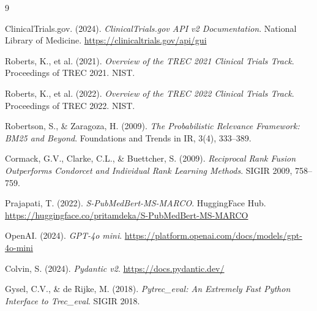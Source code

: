 \documentclass[10pt,twocolumn]{article}
\begin{document}
\begin{thebibliography}{9}

ClinicalTrials.gov. (2024). \textit{ClinicalTrials.gov API v2 Documentation}.
National Library of Medicine. \url{https://clinicaltrials.gov/api/gui}

Roberts, K., et al. (2021). \textit{Overview of the TREC 2021 Clinical Trials Track}.
Proceedings of TREC 2021. NIST.

Roberts, K., et al. (2022). \textit{Overview of the TREC 2022 Clinical Trials Track}.
Proceedings of TREC 2022. NIST.

Robertson, S., \& Zaragoza, H. (2009). \textit{The Probabilistic Relevance Framework:
BM25 and Beyond}. Foundations and Trends in IR, 3(4), 333--389.

Cormack, G.V., Clarke, C.L., \& Buettcher, S. (2009). \textit{Reciprocal Rank Fusion
Outperforms Condorcet and Individual Rank Learning Methods}. SIGIR 2009, 758--759.

Prajapati, T. (2022). \textit{S-PubMedBert-MS-MARCO}. HuggingFace Hub.
\url{https://huggingface.co/pritamdeka/S-PubMedBert-MS-MARCO}

OpenAI. (2024). \textit{GPT-4o mini}. \url{https://platform.openai.com/docs/models/gpt-4o-mini}

Colvin, S. (2024). \textit{Pydantic v2}. \url{https://docs.pydantic.dev/}

Gysel, C.V., \& de Rijke, M. (2018). \textit{Pytrec\_eval: An Extremely Fast Python
Interface to Trec\_eval}. SIGIR 2018.

\end{thebibliography}
\end{document}
